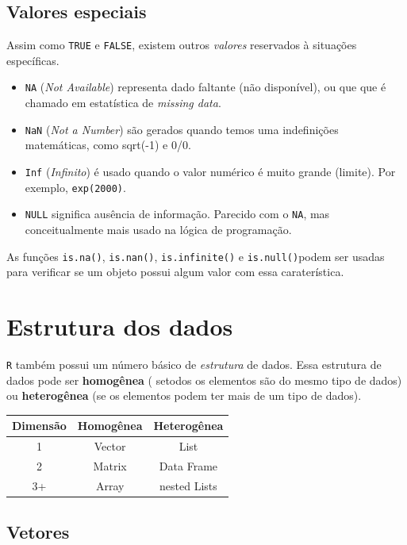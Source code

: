 \documentclass[
]{book}
\providecommand{\tightlist}{%
  \setlength{\itemsep}{0pt}\setlength{\parskip}{0pt}}
\theoremstyle{definition}
\theoremstyle{definition}
\theoremstyle{definition}
\theoremstyle{remark}
\begin{document}
\hypertarget{valores-especiais}{%
\subsection{Valores especiais}\label{valores-especiais}}

Assim como \texttt{TRUE} e \texttt{FALSE}, existem outros \emph{valores} reservados à situações específicas.

\begin{itemize}
\tightlist
\item
  \texttt{NA} (\emph{Not Available}) representa dado faltante (não disponível), ou que que é chamado em estatística de \emph{missing data}.
\item
  \texttt{NaN} (\emph{Not a Number}) são gerados quando temos uma indefinições matemáticas, como sqrt(-1) e 0/0.
\item
  \texttt{Inf} (\emph{Infinito}) é usado quando o valor numérico é muito grande (limite). Por exemplo, \texttt{exp(2000)}.
\item
  \texttt{NULL} significa ausência de informação. Parecido com o \texttt{NA}, mas conceitualmente mais usado na lógica de programação.
\end{itemize}

As funções \texttt{is.na()}, \texttt{is.nan()}, \texttt{is.infinite()} e \texttt{is.null()}podem ser usadas para verificar se um objeto possui algum valor com essa caraterística.

\hypertarget{estrutura-dos-dados}{%
\section{Estrutura dos dados}\label{estrutura-dos-dados}}

\texttt{R} também possui um número básico de \emph{estrutura} de dados. Essa estrutura de dados pode ser \textbf{homogênea} ( setodos os elementos são do mesmo tipo de dados) ou \textbf{heterogênea} (se os elementos podem ter mais de um tipo de dados).

\begin{longtable}[]{@{}ccc@{}}
\toprule
Dimensão & \textbf{Homogênea} & \textbf{Heterogênea}\tabularnewline
\midrule
\endhead
1 & Vector & List\tabularnewline
2 & Matrix & Data Frame\tabularnewline
3+ & Array & nested Lists\tabularnewline
\bottomrule
\end{longtable}

\hypertarget{vetores}{%
\subsection{Vetores}\label{vetores}}
\end{document}
